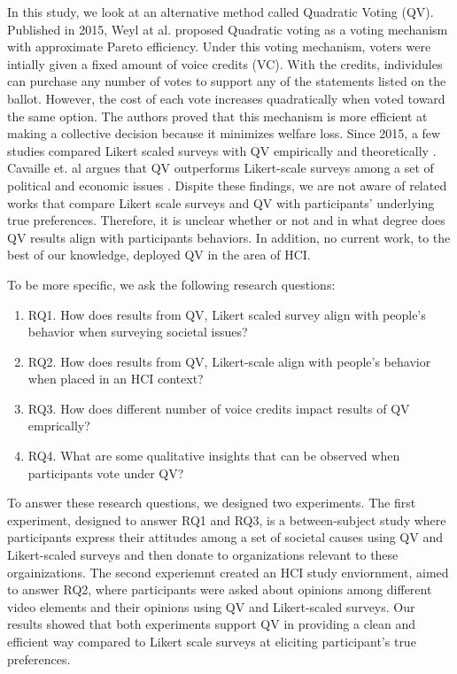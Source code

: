 In this study, 
we look at an alternative method
called Quadratic Voting (QV).
Published in 2015,
Weyl at al. \cite{posner2018radical}
proposed Quadratic voting
as a voting mechanism 
with approximate Pareto efficiency.
Under this voting mechanism,
voters were intially given 
a fixed amount of voice credits (VC).
With the credits, 
individules can purchase 
any number of votes to support any of the statements
listed on the ballot.
However, the cost of each vote 
increases quadratically 
when voted toward the same option.
The authors proved that this 
mechanism is more efficient 
at making a collective decision 
because it minimizes welfare loss.
Since 2015, a few studies
compared Likert scaled surveys with QV 
empirically and theoretically
\cite{quarfoot2017quadratic, naylor2017first}.
Cavaille et. al argues that 
QV outperforms Likert-scale surveys 
among a set of political and economic issues 
\cite{cavaille2018towards}.
Dispite these findings,
we are not aware of related works that
compare Likert scale surveys and QV
with participants' underlying true preferences.
Therefore, it is unclear whether or not
and in what degree
does QV results align with participants behaviors.
In addition, 
no current work, to the best of our knowledge,
deployed QV in the area of HCI.

To be more specific, 
we ask the following research questions:
\begin{enumerate}[label={},leftmargin=\parindent]
    \item RQ1. How does results from 
               QV, Likert scaled survey
               align with people's behavior 
               when surveying societal issues?
    \item RQ2. How does results from 
               QV, Likert-scale 
               align with people's behavior 
               when placed in an HCI context?
    \item RQ3. How does different number of 
               voice credits impact results of QV emprically?
    \item RQ4. What are some qualitative insights that can be observed
               when participants vote under QV?
\end{enumerate}
To answer these research questions,
we designed two experiments.
The first experiment,
designed to answer RQ1 and RQ3,
is a between-subject study
where participants express their attitudes
among a set of societal causes using 
QV and Likert-scaled surveys
and then donate
to organizations relevant to these orgainizations.
The second experiemnt 
created an HCI study enviornment,
aimed to answer RQ2,
where participants were asked about 
opinions among different video elements
and their opinions using QV and Likert-scaled surveys.
Our results showed that both experiments support
QV in providing a clean and efficient way
compared to Likert scale surveys
at eliciting participant's true preferences.

